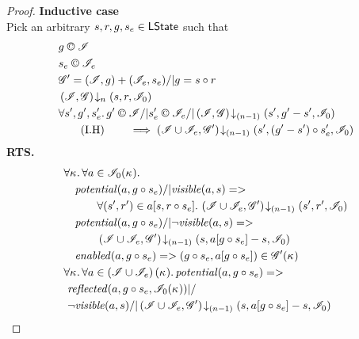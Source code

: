 \begin{lemma}
\begin{proof}
\noindent\textbf{Inductive case }\\
Pick an arbitrary $s, r, g, s_e \in \textsf{LState}$ such that
%
\begin{align}
	& g \confines \lmod \label{LEC2:Ass1}\\
	& s_e \confines \lmod_e \label{LEC2:Ass2}\\
	& \gmod' = (\lmod, g) + (\lmod_{e}, s_e) /| g = s \composeL r \label{LEC2:Ass3} \\
	& \extendsAMUpto{\lmod, \gmod}{n}{s}{r}{\lmod_0} \label{LEC2:Ass4}\\
	& \for{s', g', s_e'}  g' \confines \lmod /| s'_e \confines \lmod_e /| \extendsAMUpto{\lmod, \gmod}{(n-1)}{s'}{g'-s'}{\lmod_0} \nonumber \\
	& \tag{I.H} \qquad \implies \extendsAMUpto{\lmod \cup \lmod_{e}, \gmod'}{(n-1)}{s'}{(g'-s') \composeL s_e'}{\lmod_{0}} \label{LEC2:IH}
\end{align}
%
\textbf{RTS.}
%
\begin{align}
	& 
	\V{\ca{}}  \V{a\in \lmod_0(\ca{})} \nonumber \\
  &\quad \m{potential}(a, g \composeL s_e) /| \m{visible}(a, s) => \nonumber\\
  & \quad\qquad\for{(s', r') \in a[s, r \composeL s_e]} \extendsAMUpto{\lmod \cup \lmod_e, \gmod'}{(n-1)}{s'}{r'}{\lmod_0} \label{LEC2:Goal0}\\
% 
	&\quad \m{potential}(a, g \composeL s_e) /| \neg\m{visible}(a, s) => \nonumber\\
  & \quad\qquad \extendsAMUpto{\lmod \cup \lmod_e, \gmod'}{(n-1)}{s}{a[g \composeL s_e] - s}{\lmod_0} \label{LEC2:Goal1}\\
%   
  &\quad \m{enabled}(a,g \composeL s_e)
  => (g \composeL s_e, a[g \composeL s_e])\in \gmod'(\ca{}) \label{LEC2:Goal2}\\
%  
  &\V{\ca{}}\V{a\in \left(\lmod \cup \lmod_e \right) (\ca{})}
  \m{potential}(a,g \composeL s_e) =>\null \nonumber \\
  &\ \m{reflected}(a, g \composeL s_e, \lmod_0(\ca{})) |/\null \nonumber \\
%  
  &\ \neg\m{visible}(a, s) /| \extendsAMUpto{\lmod \cup \lmod_e, \gmod'}{(n-1)}{s}{a[g \composeL s_e] - s}{\lmod_0}  \label{LEC2:Goal3}
\end{align}
%
%


\end{proof}
\end{lemma}
